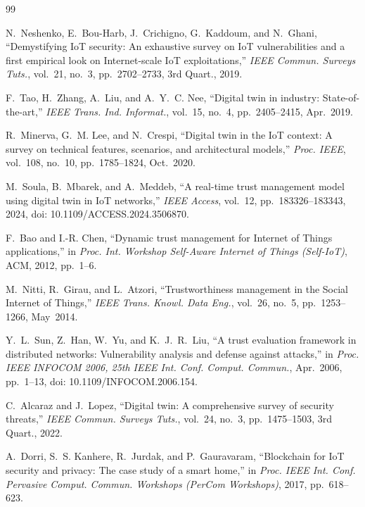 \documentclass{ieeeaccess}
\begin{document}
\begin{thebibliography}{99}

N.~Neshenko, E.~Bou-Harb, J.~Crichigno, G.~Kaddoum, and N.~Ghani,
``Demystifying IoT security: An exhaustive survey on IoT vulnerabilities
and a first empirical look on Internet-scale IoT exploitations,''
\textit{IEEE Commun. Surveys Tuts.}, vol.~21, no.~3,
pp.~2702--2733, 3rd Quart., 2019.

F.~Tao, H.~Zhang, A.~Liu, and A.~Y.~C. Nee,
``Digital twin in industry: State-of-the-art,''
\textit{IEEE Trans. Ind. Informat.}, vol.~15, no.~4,
pp.~2405--2415, Apr.~2019.

R.~Minerva, G.~M. Lee, and N.~Crespi,
``Digital twin in the IoT context: A survey on technical features,
scenarios, and architectural models,''
\textit{Proc. IEEE}, vol.~108, no.~10, pp.~1785--1824, Oct.~2020.

M.~Soula, B.~Mbarek, and A.~Meddeb,
``A real-time trust management model using digital twin in IoT networks,''
\textit{IEEE Access}, vol.~12, pp.~183326--183343, 2024,
doi: 10.1109/ACCESS.2024.3506870.

F.~Bao and I.-R. Chen,
``Dynamic trust management for Internet of Things applications,''
in \textit{Proc. Int. Workshop Self-Aware Internet of Things (Self-IoT)},
ACM, 2012, pp.~1--6.

M.~Nitti, R.~Girau, and L.~Atzori,
``Trustworthiness management in the Social Internet of Things,''
\textit{IEEE Trans. Knowl. Data Eng.}, vol.~26, no.~5,
pp.~1253--1266, May~2014.

 Y.~L.~Sun, Z.~Han, W.~Yu, and K.~J.~R.~Liu, ``A trust evaluation framework in distributed networks: Vulnerability analysis and defense against attacks,'' in \emph{Proc. IEEE INFOCOM 2006, 25th IEEE Int. Conf. Comput. Commun.}, Apr.~2006, pp.~1--13, doi: 10.1109/INFOCOM.2006.154.

C.~Alcaraz and J.~Lopez,
``Digital twin: A comprehensive survey of security threats,''
\textit{IEEE Commun. Surveys Tuts.}, vol.~24, no.~3,
pp.~1475--1503, 3rd Quart., 2022.

A.~Dorri, S.~S. Kanhere, R.~Jurdak, and P.~Gauravaram,
``Blockchain for IoT security and privacy: The case study of a smart home,''
in \textit{Proc. IEEE Int. Conf. Pervasive Comput. Commun. Workshops
(PerCom Workshops)}, 2017, pp.~618--623.


\end{thebibliography}
\end{document}
